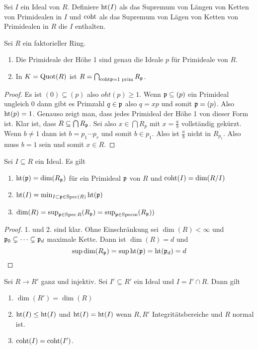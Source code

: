 \begin{Def} 
	Sei \( I \) ein Ideal von \( R \). Definiere \( \mathrm{ht}(I) \) als das Supremum von Längen von Ketten von Primidealen in \( I \)
	und \( \mathrm{coht} \) als das Supremum von Lägen von Ketten von Primidealen in \( R\) die \( I \) enthalten.
\end{Def}
\begin{Lemma}
	Sei \(R\) ein faktorieller Ring. 
	\begin{enumerate}
		\item Die Primideale der Höhe 1 sind genau die Ideale \(p\) für Primideale von \(R\).
		\item In \(K=\operatorname{Quot}(R)\) ist \(R=\bigcap_{\mathrm{coht}\mathfrak{p}=1 \text{ prim}}R_{\mathfrak{p}}\).
	\end{enumerate}
\end{Lemma}
\begin{proof}
	Es ist \((0)\subseteq (p)\) also \(oht(p)\geq 1\). Wenn \(\mathfrak{p}\subseteq (p)\) ein Primideal ungleich \(0\) dann
	gibt es Primzahl \(q\in \mathfrak{p}\) also \(q=xp\) und somit \(\mathfrak{p}=(p)\). Also \(\mathrm{ht}(p)=1\).
	Genauso zeigt man, dass jedes Primideal der Höhe 1 von dieser Form ist.
	Klar ist, dass \(R\subseteq \bigcap R_{\mathfrak{p}}\). Sei also \(x\in \bigcap R_p\) mit \(x=\frac a b\) vollständig gekürzt.
	Wenn \(b\neq 1\) dann ist \(b=p_1\cdots p_r\) und somit \(b\in p_1\).
	Also ist \(\frac a b\) nicht in \(R_{p_1}\). Also muss \(b=1\) sein und somit \(x\in R\).
\end{proof}
\begin{Lemma}
	Sei \( I \subseteq R \) ein Ideal. Es gilt
	\begin{enumerate}
		\item \( \mathrm{ht}(\mathfrak{p})=\dim(R_{\mathfrak{p}}) \) für ein Primideal \( \mathfrak{p} \) von \( R \) und \(\mathrm{coht}(I)=\dim(R/I)\)
		\item \( \mathrm{ht}(I)=\min_{I\subset\mathfrak{p}\in\operatorname{Spec}(R)} \mathrm{ht}(\mathfrak{p})\)
		\item \(\dim (R)=\sup_{\mathfrak{p}\in\operatorname{Spec} R} (R_{\mathfrak{p}}) = \sup_{\mathfrak{p} \in \operatorname{Specm}} (R_{\mathfrak{p}}))\)
	\end{enumerate}
	
\end{Lemma}
\begin{proof}
	1. und 2. sind klar. 
	Ohne Einschränkung sei \( \dim (R)<\infty\) und \(\mathfrak{p}_0\subsetneq \dots \subsetneq \mathfrak{p}_d\) maximale Kette.
	Dann ist \( \dim(R)=d\) und 
	\[\sup \dim(R_{\mathfrak{p}})=\sup\mathrm{ht}(\mathfrak{p})=\mathrm{ht}(\mathfrak{p}_d)=d\]
\end{proof}
\begin{Satz} \label{Satz:GanzDim}
	Sei \( R \to R' \) ganz und injektiv. Sei \( I' \subseteq R'\) ein Ideal und \( I = I' \cap R \). Dann gilt
	\begin{enumerate}
		\item \( \dim(R')=\dim(R) \)
		\item \( \mathrm{ht}(I)\leq \mathrm{ht}(I) \) und \( \mathrm{ht}(I)= \mathrm{ht}(I) \) wenn \( R, R' \) Integritätsbereiche und \( R \) normal ist.
		\item \( \mathrm{coht}(I)=\mathrm{coht}(I')\).
	\end{enumerate}
\end{Satz}
